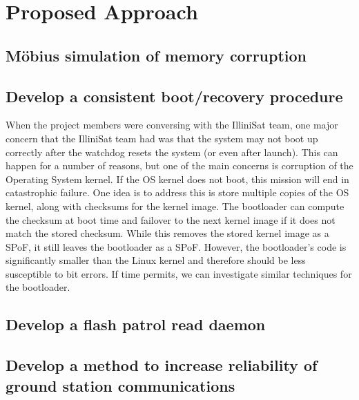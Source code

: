 \section{Proposed Approach}
\subsection{M\"obius simulation of memory corruption}

\subsection{Develop a consistent boot/recovery procedure}
When the project members were conversing with the IlliniSat team, one major
concern that the IlliniSat team had was that the system may not boot up
correctly after the watchdog resets the system (or even after launch).  This can
happen for a number of reasons, but one of the main concerns is corruption of
the Operating System kernel.  If the OS kernel does not boot, this mission will
end in catastrophic failure.  One idea is to address this is store multiple
copies of the OS kernel, along with checksums for the kernel image.  The
bootloader can compute the checksum at boot time and failover to the next kernel
image if it does not match the stored checksum.  While this removes the stored
kernel image as a SPoF, it still leaves the bootloader as a SPoF.  However, the
bootloader's code is significantly smaller than the Linux kernel and therefore
should be less susceptible to bit errors.  If time permits, we can investigate
similar techniques for the bootloader. 

\subsection{Develop a flash patrol read daemon}

\subsection{Develop a method to increase reliability of ground station
communications}

